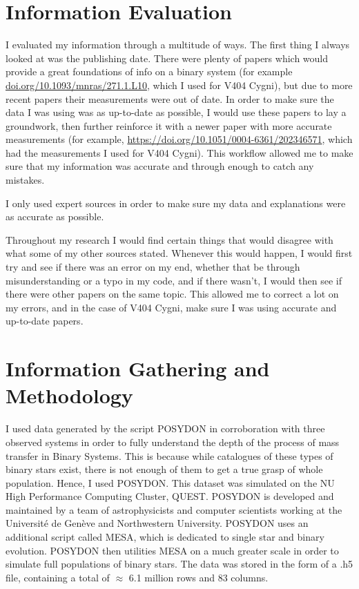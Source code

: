 \documentclass[12pt, a4paper]{article}
\begin{document}
\section{Information Evaluation}
    I evaluated my information through a multitude of ways. The first thing I always looked at was the publishing date. There were plenty of papers which would provide a great foundations of info on a binary system (for example \url{doi.org/10.1093/mnras/271.1.L10}, which I used for V404 Cygni), but due to more recent papers their measurements were out of date. In order to make sure the data I was using was as up-to-date as possible, I would use these papers to lay a groundwork, then further reinforce it with a newer paper with more accurate measurements (for example, \url{https://doi.org/10.1051/0004-6361/202346571}, which had the measurements I used for V404 Cygni). This workflow allowed me to make sure that my information was accurate and through enough to catch any mistakes.

    I only used expert sources in order to make sure my data and explanations were as accurate as possible.

    Throughout my research I would find certain things that would disagree with what some of my other sources stated. Whenever this would happen, I would first try and see if there was an error on my end, whether that be through misunderstanding or a typo in my code, and if there wasn't, I would then see if there were other papers on the same topic. This allowed me to correct a lot on my errors, and in the case of V404 Cygni, make sure I was using accurate and up-to-date papers. 

\section{Information Gathering and Methodology}

    I used data generated by the script POSYDON in corroboration with three observed systems in order to fully understand the depth of the process of mass transfer in Binary Systems. This is because while catalogues of these types of binary stars exist, there is not enough of them to get a true grasp of whole population. Hence, I used POSYDON. This dataset was simulated on the NU High Performance Computing Cluster, QUEST. POSYDON is developed and maintained by a team of astrophysicists and computer scientists working at the Université de Genève and Northwestern University. POSYDON uses an additional script called MESA, which is dedicated to single star and binary evolution. POSYDON then utilities MESA on a much greater scale in order to simulate full populations of binary stars. The data was stored in the form of a .h5 file, containing a total of $\approx$ 6.1 million rows and 83 columns.
\end{document}
